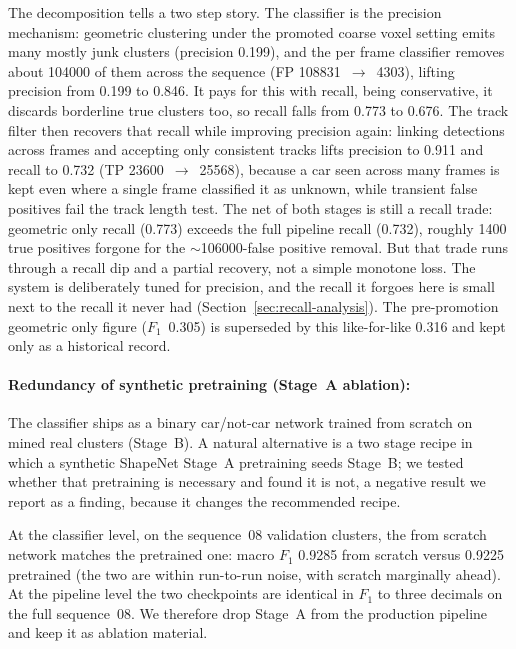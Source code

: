\documentclass[a4paper,12pt]{report}
\begin{document}
The decomposition tells a two step story. The classifier
is the precision mechanism: geometric clustering under the promoted coarse voxel
setting emits many mostly junk clusters (precision \num{0.199}), and the per frame
classifier removes about \num{104000} of them across the sequence
(FP \num{108831}~$\rightarrow$~\num{4303}), lifting precision from \num{0.199} to
\num{0.846}. It pays for this with recall, being conservative, it discards
borderline true clusters too, so recall falls from \num{0.773} to \num{0.676}.
The track filter then recovers that recall while improving precision
again: linking detections across frames and accepting only consistent tracks
lifts precision to \num{0.911} and recall to \num{0.732} (TP
\num{23600}~$\rightarrow$~\num{25568}), because a car seen across many frames is
kept even where a single frame classified it as unknown, while transient
false positives fail the track length test. The net of both stages is still a
recall trade: geometric only recall (\num{0.773}) exceeds the full pipeline
recall (\num{0.732}), roughly \num{1400} true positives forgone for the
$\sim$\num{106000}-false positive removal. But that trade runs through a
recall dip and a partial recovery, not a simple monotone loss. The system is deliberately tuned for precision, and the
recall it forgoes here is small next to the recall it never had (Section~\ref{sec:recall-analysis}). The
pre-promotion geometric only figure ($F_1$~\num{0.305}) is
superseded by this like-for-like \num{0.316} and kept only as a historical
record.

\paragraph{Redundancy of synthetic pretraining (Stage~A ablation):}
\label{sec:ablation-stagea}

The classifier ships as a binary car/not-car network trained from scratch
on mined real clusters (Stage~B). A natural alternative is a two stage
recipe in which a synthetic ShapeNet Stage~A pretraining seeds Stage~B; we tested
whether that pretraining is necessary and found it is not, a negative result we
report as a finding, because it changes the recommended recipe.

At the classifier level, on the sequence~08 validation clusters, the from scratch
network matches the pretrained one: macro $F_1$ \num{0.9285} from scratch versus
\num{0.9225} pretrained (the two are within run-to-run noise, with
scratch marginally ahead). At the pipeline level the two checkpoints are
identical in $F_1$ to three decimals on the full sequence~08. We therefore
drop Stage~A from the production pipeline and keep it as ablation material.
\end{document}
